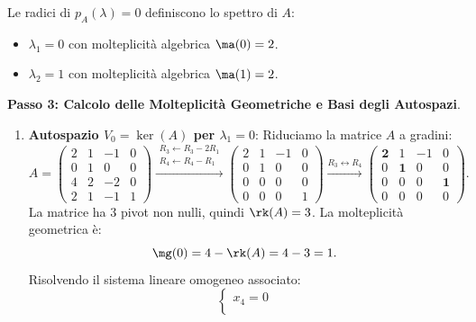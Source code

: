 \begin{dimostrazione}
Le radici di $p_A(\lambda) = 0$ definiscono lo spettro di $A$:
\begin{itemize}
    \item $\lambda_1 = 0$ con molteplicità algebrica $\ma(0) = 2$.
    \item $\lambda_2 = 1$ con molteplicità algebrica $\ma(1) = 2$.
\end{itemize}

\textbf{Passo 3: Calcolo delle Molteplicità Geometriche e Basi degli Autospazi}.

\begin{enumerate}
    \item \textbf{Autospazio $V_0 = \ker(A)$ per $\lambda_1 = 0$}:
    Riduciamo la matrice $A$ a gradini:
    \begin{equation}
        A = \begin{pmatrix}
            2 & 1 & -1 & 0 \\
            0 & 1 & 0 & 0 \\
            4 & 2 & -2 & 0 \\
            2 & 1 & -1 & 1
        \end{pmatrix}
        \xrightarrow{\substack{R_3 \leftarrow R_3 - 2R_1 \\ R_4 \leftarrow R_4 - R_1}}
        \begin{pmatrix}
            2 & 1 & -1 & 0 \\
            0 & 1 & 0 & 0 \\
            0 & 0 & 0 & 0 \\
            0 & 0 & 0 & 1
        \end{pmatrix}
        \xrightarrow{R_3 \leftrightarrow R_4}
        \begin{pmatrix}
            \mathbf{2} & 1 & -1 & 0 \\
            0 & \mathbf{1} & 0 & 0 \\
            0 & 0 & 0 & \mathbf{1} \\
            0 & 0 & 0 & 0
        \end{pmatrix}.
    \end{equation}
    La matrice ha 3 pivot non nulli, quindi $\rk(A) = 3$.
    La molteplicità geometrica è:
    \begin{equation}
        \mg(0) = 4 - \rk(A) = 4 - 3 = 1.
    \end{equation}
    Risolvendo il sistema lineare omogeneo associato:
    \begin{equation}
        \begin{cases}
            x_4 = 0 \\

\end{cases}
\end{equation}
\end{enumerate}
\end{dimostrazione}
